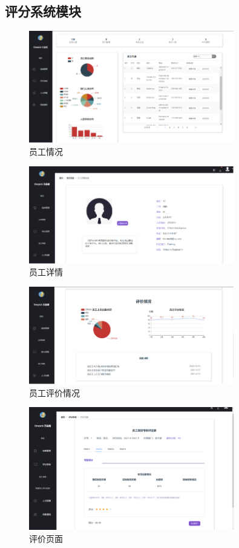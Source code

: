\documentclass[UTF8]{ctexart}
\begin{document}
\subsection{评分系统模块}
\begin{figure}[H]
	\centering
	\includegraphics[width=0.8\textwidth]{6.png}
	\caption{员工情况}
\end{figure}
\begin{figure}[H]
	\centering
	\includegraphics[width=0.8\textwidth]{7.png}
	\caption{员工详情}
\end{figure}
\begin{figure}[H]
	\centering
	\includegraphics[width=0.8\textwidth]{8.png}
	\caption{员工评价情况}
\end{figure}
\begin{figure}[H]
	\centering
	\includegraphics[width=0.8\textwidth]{9.png}
	\caption{评价页面}
\end{figure}
\end{document}
